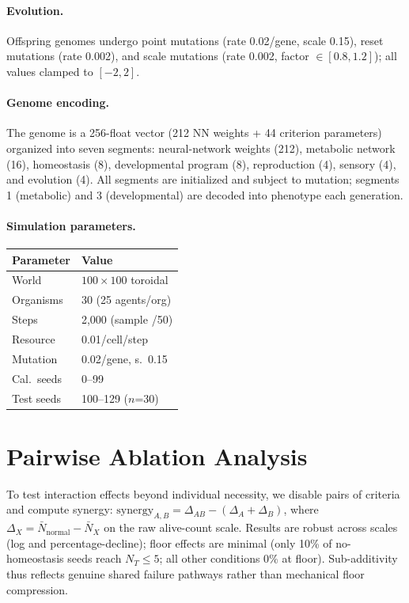 \documentclass[letterpaper]{article}
\begin{document}
\paragraph{Evolution.}
Offspring genomes undergo point mutations (rate 0.02/gene, scale 0.15), reset
mutations (rate 0.002), and scale mutations (rate 0.002, factor $\in [0.8,1.2]$);
all values clamped to $[-2,2]$.

\paragraph{Genome encoding.}
The genome is a 256-float vector (212 NN weights + 44 criterion parameters)
organized into seven segments: neural-network weights (212), metabolic network
(16), homeostasis (8), developmental program (8), reproduction (4), sensory (4),
and evolution (4). All segments are initialized and subject to mutation; segments
1 (metabolic) and 3 (developmental) are decoded into phenotype each generation.

\paragraph{Simulation parameters.}

\smallskip
\scriptsize
\begin{tabular}{@{}ll@{}}
\toprule
Parameter & Value \\
\midrule
World & $100{\times}100$ toroidal \\
Organisms & 30 (25 agents/org) \\
Steps & 2,000 (sample /50) \\
Resource & 0.01/cell/step \\
Mutation & 0.02/gene, s.\ 0.15 \\
Cal.\ seeds & 0--99 \\
Test seeds & 100--129 ($n$=30) \\
\bottomrule
\end{tabular}
\normalsize

\section{Pairwise Ablation Analysis}

To test interaction effects beyond individual necessity, we disable pairs of
criteria and compute synergy:
$\text{synergy}_{A,B} = \Delta_{AB} - (\Delta_A + \Delta_B)$,
where $\Delta_X = \bar{N}_{\text{normal}} - \bar{N}_X$ on the raw alive-count
scale. Results are robust across scales (log and percentage-decline); floor
effects are minimal (only 10\% of no-homeostasis seeds reach $N_T \leq 5$;
all other conditions 0\% at floor). Sub-additivity thus reflects genuine shared
failure pathways rather than mechanical floor compression.
\end{document}
